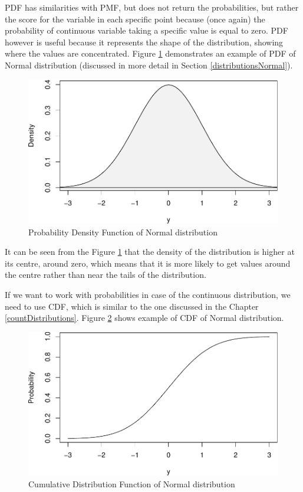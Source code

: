 \documentclass[
]{book}
\theoremstyle{definition}
\theoremstyle{definition}
\theoremstyle{definition}
\theoremstyle{definition}
\theoremstyle{remark}
\begin{document}
PDF has similarities with PMF, but does not return the probabilities, but rather the score for the variable in each specific point because (once again) the probability of continuous variable taking a specific value is equal to zero. PDF however is useful because it represents the shape of the distribution, showing where the values are concentrated. Figure \ref{fig:dnormPlotIntro} demonstrates an example of PDF of Normal distribution (discussed in more detail in Section \ref{distributionsNormal}).

\begin{figure}
\centering
\includegraphics{Svetunkov---Statistics-for-Business-Analytics_files/figure-latex/dnormPlotIntro-1.pdf}
\caption{\label{fig:dnormPlotIntro}Probability Density Function of Normal distribution}
\end{figure}

It can be seen from the Figure \ref{fig:dnormPlotIntro} that the density of the distribution is higher at its centre, around zero, which means that it is more likely to get values around the centre rather than near the tails of the distribution.

If we want to work with probabilities in case of the continuous distribution, we need to use CDF, which is similar to the one discussed in the Chapter \ref{countDistributions}. Figure \ref{fig:dnormPlotIntroCDF} shows example of CDF of Normal distribution.

\begin{figure}
\centering
\includegraphics{Svetunkov---Statistics-for-Business-Analytics_files/figure-latex/dnormPlotIntroCDF-1.pdf}
\caption{\label{fig:dnormPlotIntroCDF}Cumulative Distribution Function of Normal distribution}
\end{figure}
\end{document}
